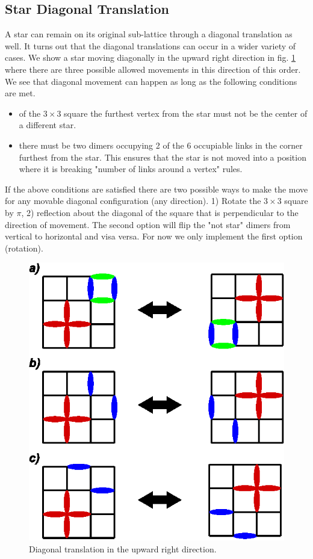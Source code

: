 \documentclass[aps,floatfix,11pt]{revtex4-1}
\begin{document}
\subsection{Star Diagonal Translation}
A star can remain on its original sub-lattice through a diagonal translation as well. It turns out
that the diagonal translations can occur in a wider variety of cases. We show a star moving
diagonally in the upward right direction in fig. \ref{fig:diag} where there are three possible
allowed movements in this direction of this order. We see that diagonal movement can happen as long as
the following conditions are met.

\begin{itemize}
    \item of the $3\times 3$ square the furthest vertex from the star must not be the center of a
        different star.
    \item there must be two dimers occupying 2 of the 6 occupiable links in the corner furthest from
        the star. This ensures that the star is not moved into a position where it is breaking
        "number of links around a vertex" rules.
\end{itemize}

\noindent
If the above conditions are satisfied there are two possible ways to make the move for any movable
diagonal configuration (any direction). 1) Rotate the $3\times3$ square by $\pi$, 2) reflection
about the diagonal of the square that is perpendicular to the direction of movement. The second
option will flip the "not star" dimers from vertical to horizontal and visa versa. For now we only
implement the first option (rotation).

\begin{figure}[h]
    \centering
    \includegraphics[width=8.5 cm]{diag}
    \caption{Diagonal translation in the upward right direction.
\label{fig:diag}}
\end{figure}
\end{document}
